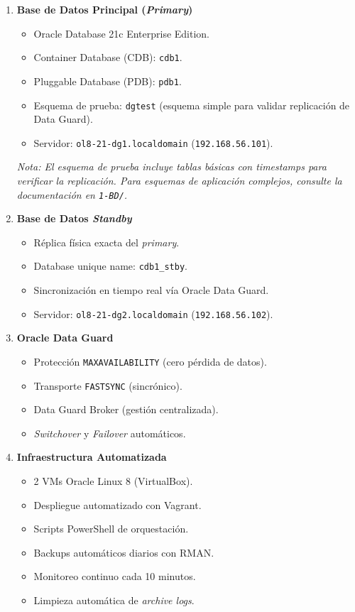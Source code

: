 \documentclass[11pt, a4paper]{report}
\begin{document}
\begin{enumerate}
    \item \textbf{Base de Datos Principal (\textit{Primary})}
    \begin{itemize}
        \item Oracle Database 21c Enterprise Edition.
\item Container Database (CDB): \texttt{cdb1}.
        \item Pluggable Database (PDB): \texttt{pdb1}.
        \item Esquema de prueba: \texttt{dgtest} (esquema simple para validar replicación de Data Guard).
        \item Servidor: \texttt{ol8-21-dg1.localdomain} (\texttt{192.168.56.101}).
\end{itemize}
    \vspace{0.3em}
    \textit{Nota: El esquema de prueba incluye tablas básicas con timestamps para verificar la replicación. Para esquemas de aplicación complejos, consulte la documentación en \texttt{1-BD/}.}
    \item \textbf{Base de Datos \textit{Standby}}
    \begin{itemize}
        \item Réplica física exacta del \textit{primary}.
\item Database unique name: \texttt{cdb1\_stby}.
        \item Sincronización en tiempo real vía Oracle Data Guard.
        \item Servidor: \texttt{ol8-21-dg2.localdomain} (\texttt{192.168.56.102}).
\end{itemize}
    \item \textbf{Oracle Data Guard}
    \begin{itemize}
        \item Protección \texttt{MAXAVAILABILITY} (cero pérdida de datos).
\item Transporte \texttt{FASTSYNC} (sincrónico).
        \item Data Guard Broker (gestión centralizada).
        \item \textit{Switchover} y \textit{Failover} automáticos.
\end{itemize}
    \item \textbf{Infraestructura Automatizada}
    \begin{itemize}
        \item 2 VMs Oracle Linux 8 (VirtualBox).
\item Despliegue automatizado con Vagrant.
        \item Scripts PowerShell de orquestación.
        \item Backups automáticos diarios con RMAN.
\item Monitoreo continuo cada 10 minutos.
        \item Limpieza automática de \textit{archive logs}.
\end{itemize}
\end{enumerate}
\end{document}
